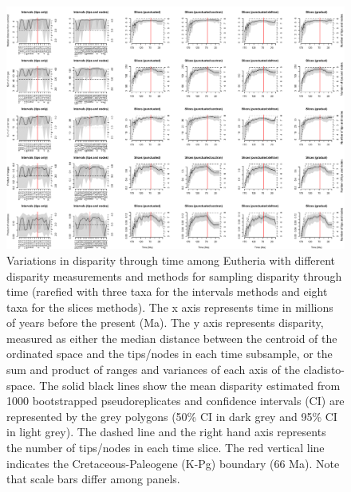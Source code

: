\begin{landscape}
\begin{figure}[!htbp]
\centering
    \includegraphics[width=\textwidth,height=\textheight,keepaspectratio]{Supplementaries/Figures/STD/Eutheria_all_methods_rarefied.pdf}
\caption[Comparison of all the disparity metrics and all the time sampling methods for Eutheria (rarefied)]{Variations in disparity through time among Eutheria  with different disparity measurements and methods for sampling disparity through time (rarefied with three taxa for the intervals methods and eight taxa for the slices methods). The x axis represents time in millions of years before the present (Ma). The y axis represents disparity, measured as either the median distance between the centroid of the ordinated space and the tips/nodes in each time subsample, or the sum and product of ranges and variances of each axis of the cladisto-space. The solid black lines show the mean disparity estimated from 1000 bootstrapped pseudoreplicates and confidence intervals (CI) are represented by the grey polygons (50\% CI in dark grey and 95\% CI in light grey). The dashed line and the right hand axis represents the number of tips/nodes in each time slice. The red vertical line indicates the Cretaceous-Paleogene (K-Pg) boundary (66 Ma). Note that scale bars differ among panels.}
\label{Supp_disparity_all_Eutheria_rarefied}

\end{figure}
\end{landscape}